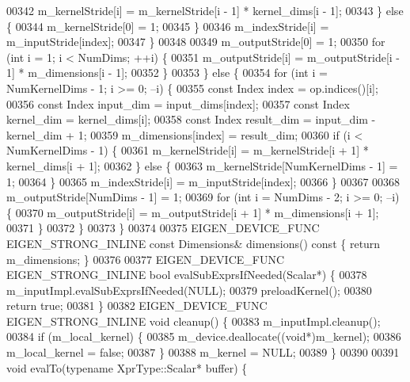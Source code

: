 \begin{DoxyCode}
00342           m\_kernelStride[i] = m\_kernelStride[i - 1] * kernel\_dims[i - 1];
00343         \} \textcolor{keywordflow}{else} \{
00344           m\_kernelStride[0] = 1;
00345         \}
00346         m\_indexStride[i] = m\_inputStride[index];
00347       \}
00348 
00349       m\_outputStride[0] = 1;
00350       \textcolor{keywordflow}{for} (\textcolor{keywordtype}{int} i = 1; i < NumDims; ++i) \{
00351         m\_outputStride[i] = m\_outputStride[i - 1] * m\_dimensions[i - 1];
00352       \}
00353     \} \textcolor{keywordflow}{else} \{
00354       \textcolor{keywordflow}{for} (\textcolor{keywordtype}{int} i = NumKernelDims - 1; i >= 0; --i) \{
00355         \textcolor{keyword}{const} Index index = op.indices()[i];
00356         \textcolor{keyword}{const} Index input\_dim = input\_dims[index];
00357         \textcolor{keyword}{const} Index kernel\_dim = kernel\_dims[i];
00358         \textcolor{keyword}{const} Index result\_dim = input\_dim - kernel\_dim + 1;
00359         m\_dimensions[index] = result\_dim;
00360         \textcolor{keywordflow}{if} (i < NumKernelDims - 1) \{
00361           m\_kernelStride[i] = m\_kernelStride[i + 1] * kernel\_dims[i + 1];
00362         \} \textcolor{keywordflow}{else} \{
00363           m\_kernelStride[NumKernelDims - 1] = 1;
00364         \}
00365         m\_indexStride[i] = m\_inputStride[index];
00366       \}
00367 
00368       m\_outputStride[NumDims - 1] = 1;
00369       \textcolor{keywordflow}{for} (\textcolor{keywordtype}{int} i = NumDims - 2; i >= 0; --i) \{
00370         m\_outputStride[i] = m\_outputStride[i + 1] * m\_dimensions[i + 1];
00371       \}
00372     \}
00373   \}
00374 
00375   EIGEN\_DEVICE\_FUNC EIGEN\_STRONG\_INLINE \textcolor{keyword}{const} Dimensions& dimensions()\textcolor{keyword}{ const }\{ \textcolor{keywordflow}{return} m\_dimensions; \}
00376 
00377   EIGEN\_DEVICE\_FUNC EIGEN\_STRONG\_INLINE \textcolor{keywordtype}{bool} evalSubExprsIfNeeded(Scalar*) \{
00378     m\_inputImpl.evalSubExprsIfNeeded(NULL);
00379     preloadKernel();
00380     \textcolor{keywordflow}{return} \textcolor{keyword}{true};
00381   \}
00382   EIGEN\_DEVICE\_FUNC EIGEN\_STRONG\_INLINE \textcolor{keywordtype}{void} cleanup() \{
00383     m\_inputImpl.cleanup();
00384     \textcolor{keywordflow}{if} (m\_local\_kernel) \{
00385       m\_device.deallocate((\textcolor{keywordtype}{void}*)m\_kernel);
00386       m\_local\_kernel = \textcolor{keyword}{false};
00387     \}
00388     m\_kernel = NULL;
00389   \}
00390 
00391   \textcolor{keywordtype}{void} evalTo(\textcolor{keyword}{typename} XprType::Scalar* buffer) \{

\end{DoxyCode}
